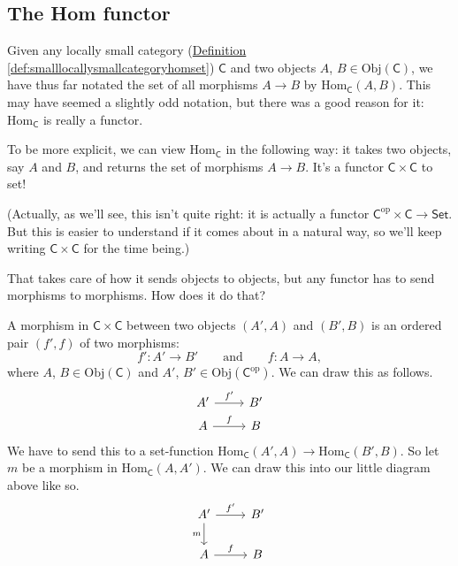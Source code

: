 \documentclass[a4paper,10pt]{scrreprt}
\newcommand{\Obj}{\mathrm{Obj}}
\newcommand{\Hom}{\mathrm{Hom}}
\theoremstyle{definition}
\theoremstyle{plain}
\theoremstyle{remark}
\begin{document}
\subsection{The Hom functor} \label{section:homfunctor}
Given any locally small category (\hyperref[def:smalllocallysmallcategoryhomset]{Definition \ref*{def:smalllocallysmallcategoryhomset}}) $\mathsf{C}$ and two objects $A$, $B \in \Obj(\mathsf{C})$, we have thus far notated the set of all morphisms $A \to B$ by $\Hom_{\mathsf{C}}(A, B)$. This may have seemed a slightly odd notation, but there was a good reason for it: $\Hom_{\mathsf{C}}$ is really a functor.

To be more explicit, we can view $\Hom_{\mathsf{C}}$ in the following way: it takes two objects, say $A$ and $B$, and returns the set of morphisms $A \to B$. It's a functor $\mathsf{C} \times \mathsf{C}$ to set!

(Actually, as we'll see, this isn't quite right: it is actually a functor $\mathsf{C}^{\text{op}} \times \mathsf{C} \to \mathsf{Set}$. But this is easier to understand if it comes about in a natural way, so we'll keep writing $\mathsf{C} \times \mathsf{C}$ for the time being.)

That takes care of how it sends objects to objects, but any functor has to send morphisms to morphisms. How does it do that?

A morphism in $\mathsf{C} \times \mathsf{C}$ between two objects $(A', A)$ and $(B', B)$ is an ordered pair $(f', f)$ of two morphisms:
\begin{equation*}
  f'\colon A' \to B'\qquad\text{and}\qquad f\colon A \to A,
\end{equation*}
where $A$, $B \in \Obj(\mathsf{C})$ and $A'$, $B' \in \Obj(\mathsf{C}^{\mathrm{op}})$. We can draw this as follows.
\begin{equation*}
  \begin{tikzcd}[row sep=tiny]
    A' 
    \arrow[r, "f'"]
    & B'
    \\
    A
    \arrow[r, "f"]
    & B
  \end{tikzcd}
\end{equation*}
We have to send this to a set-function $\Hom_{\mathsf{C}}(A', A) \to \Hom_{\mathsf{C}}(B', B)$. So let $m$ be a morphism in $\Hom_{\mathsf{C}}(A, A')$. We can draw this into our little diagram above like so.
\begin{equation*}
  \begin{tikzcd}
    A' 
    \arrow[r, "f'"]
    \arrow[d, swap, "m"]
    & B'
    \\
    A
    \arrow[r, "f"]
    & B
  \end{tikzcd}
\end{equation*}
\end{document}
